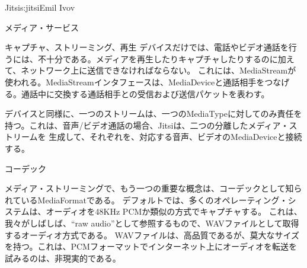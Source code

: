 \begin{aosachapter}{Jitsi}{s:jitsi}{Emil Ivov}
\begin{aosasect1}{メディア・サービス}
\begin{aosasect2}{キャプチャ、ストリーミング、再生}
デバイスだけでは、電話やビデオ通話を行うには、不十分である。メディアを再生したりキャプチャしたりするのに加えて、ネットワーク上に送信できなければならない。
これには、MediaStreamが使われる。MediaStreamインタフェースは、MediaDeviceと通話相手をつなげる。通話中に交換する通話相手との受信および送信パケットを表わす。

デバイスと同様に、一つのストリームは、一つのMediaTypeに対してのみ責任を持つ。これは、音声/ビデオ通話の場合、Jitsiは、二つの分離したメディア・ストリームを
生成して、それぞれを、対応する音声、ビデオのMediaDeviceと接続する。


\end{aosasect2}

\begin{aosasect2}{コーデック}

メディア・ストリーミングで、もう一つの重要な概念は、コーデックとして知られているMediaFormatである。
デフォルトでは、多くのオペレーティング・システムは、オーディオを48KHz PCMか類似の方式でキャプチャする。
これは、我々がしばしば、``raw audio''として参照するもので、WAVファイルとして取得するオーディオ方式である。
WAVファイルは、高品質であるが、莫大なサイズを持つ。これは、PCMフォーマットでインターネット上にオーディオを転送を試みるのは、非現実的である。


\end{aosasect2}
\end{aosasect1}
\end{aosachapter}
